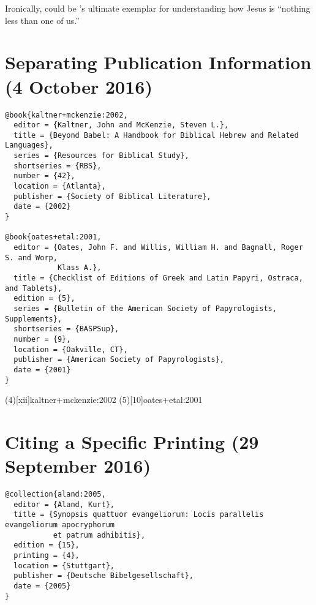 \documentclass[a4paper]{article}
\begin{document}
\begin{verbcite}
  Ironically,  could be
  \citeauthor{scorsese:aviator}’s ultimate exemplar for understanding how
  Jesus is “nothing less than one of us.”
\end{verbcite}
\begin{verbcite}
  \nocite{scorsese:aviator:dvd, scorsese+schoonmaker+mann:aviator, ebert:2004,
    dargis:2004}
\end{verbcite}
\examplebibliography
{}

\section{Separating Publication Information (4 October 2016)}

\begin{verbatim}
@book{kaltner+mckenzie:2002,
  editor = {Kaltner, John and McKenzie, Steven L.},
  title = {Beyond Babel: A Handbook for Biblical Hebrew and Related Languages},
  series = {Resources for Biblical Study},
  shortseries = {RBS},
  number = {42},
  location = {Atlanta},
  publisher = {Society of Biblical Literature},
  date = {2002}
}

@book{oates+etal:2001,
  editor = {Oates, John F. and Willis, William H. and Bagnall, Roger S. and Worp,
            Klass A.},
  title = {Checklist of Editions of Greek and Latin Papyri, Ostraca, and Tablets},
  edition = {5},
  series = {Bulletin of the American Society of Papyrologists, Supplements},
  shortseries = {BASPSup},
  number = {9},
  location = {Oakville, CT},
  publisher = {American Society of Papyrologists},
  date = {2001}
}
\end{verbatim}

\examplecite(4)[xii]{kaltner+mckenzie:2002}
\examplecite(5)[10]{oates+etal:2001}
\exampleabbreviations
\examplebibliography
{}

\section{Citing a Specific Printing (29 September 2016)}

\begin{verbatim}
@collection{aland:2005,
  editor = {Aland, Kurt},
  title = {Synopsis quattuor evangeliorum: Locis parallelis evangeliorum apocryphorum
           et patrum adhibitis},
  edition = {15},
  printing = {4},
  location = {Stuttgart},
  publisher = {Deutsche Bibelgesellschaft},
  date = {2005}
}
\end{verbatim}
\end{document}
